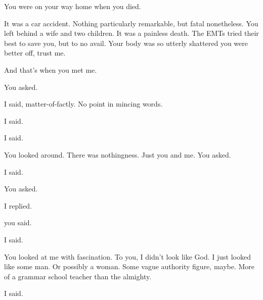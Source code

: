 \newpage

\setcounter{page}{1}

{\LARGE Y}ou were on your way home when you died.

It was a car accident. Nothing particularly remarkable, but fatal nonetheless. You left behind a wife and two children. It was a painless death. The EMTs tried their best to save you, but to no avail. Your body was so utterly shattered you were better off, trust me.

And that's when you met me.

 You asked. 

 I said, matter-of-factly. No point in mincing words.



 I said.


 I said.

You looked around. There was nothingness. Just you and me.  You asked. 

 I said.

 You asked.

 I replied. 

 you said.



 I said. 

You looked at me with fascination. To you, I didn't look like God. I just looked like some man. Or possibly a woman. Some vague authority figure, maybe. More of a grammar school teacher than the almighty.

 I said. 

